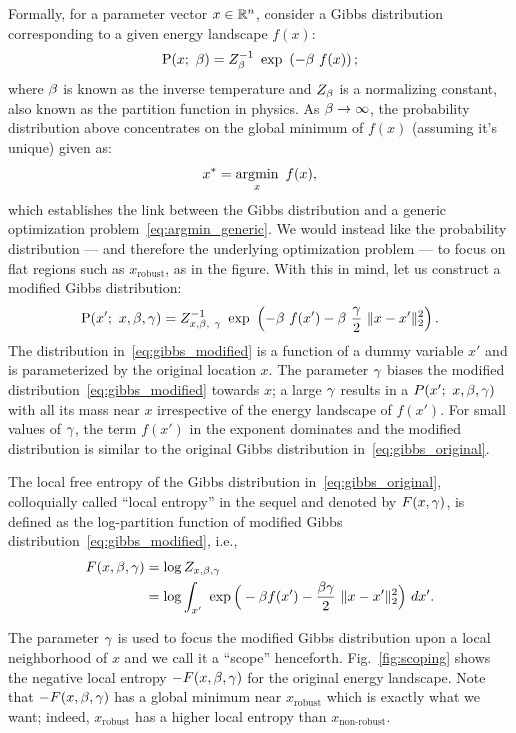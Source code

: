 \documentclass[10pt]{article}
\begin{document}
Formally, for a parameter vector $x \in \mathbb{R}^n$, consider a Gibbs distribution corresponding to a given energy landscape $f(x)$:
\begin{equation}
    \P(x;\ \b) = Z_\b^{-1}\ \exp\ \rbrac{-\b\ f(x)};
    \label{eq:gibbs_original}
\end{equation}
where $\beta$ is known as the inverse temperature and $Z_\beta$ is a normalizing constant, also known 
as the partition function in physics. As $\beta \to \infty$, the probability distribution above concentrates on the global minimum of $f(x)$ (assuming it's unique) given as:
\begin{equation}
    x^* = \operatorname*{argmin}_x\ f(x),
    \label{eq:argmin_generic}
\end{equation}
which establishes the link between the Gibbs distribution and a generic optimization problem~\eqref{eq:argmin_generic}. We would instead like the probability distribution --- and therefore the underlying optimization problem --- to focus on flat regions such as $x_{\textrm{robust}}$, as in the figure. With this in mind, let us construct a modified Gibbs distribution:
\begin{equation}
    \P(x';\ x, \b, \g) = Z_{x,\b,\ \g}^{-1}\ \exp\ \rbrac{-\b\ f(x') - \b\ \f{\g}{2}\ \norm{x-x'}^2_2}.
    \label{eq:gibbs_modified}
\end{equation}
The distribution in~\eqref{eq:gibbs_modified} is a function of a dummy variable $x'$ and is parameterized by the original location $x$. The parameter $\gamma$ biases the modified distribution~\eqref{eq:gibbs_modified} towards $x$; a large $\gamma$ results in a $P(x';\ x,\beta,\gamma)$ with all its mass near $x$ irrespective of the energy landscape of $f(x')$. For small values of $\gamma$, the term $f(x')$ in the exponent dominates and the modified distribution is similar to the original Gibbs distribution in~\eqref{eq:gibbs_original}. 

\begin{definition}
\label{def:local_entropy}
The local free entropy of the Gibbs distribution in~\eqref{eq:gibbs_original}, colloquially called ``local entropy'' in the sequel and denoted by $F(x, \gamma)$, is defined as the log-partition function of modified Gibbs distribution~\eqref{eq:gibbs_modified}, i.e.,
\begin{align}
    F(x, \beta, \g) &= \log Z_{x, \beta, \g} \notag\\
    &= \log \int_{x'}\ \exp \Big(-\beta f(x') - \f{\beta\g}{2}\ \norm{x-x'}^2_2 \Big)\ dx'.
    \label{eq:local_entropy}
\end{align}
\end{definition}
The parameter $\gamma$ is used to focus the modified Gibbs distribution upon a local neighborhood of $x$ and we call it a ``scope'' henceforth. Fig.~\ref{fig:scoping} shows the negative local entropy $-F(x, \beta,  \gamma)$ for the original energy landscape. Note that $-F(x, \beta, \gamma)$ has a global minimum near $x_{\textrm{robust}}$ which is exactly what we want; indeed, $x_{\textrm{robust}}$ has a higher local entropy than $x_{\textrm{non-robust}}$.
\end{document}
